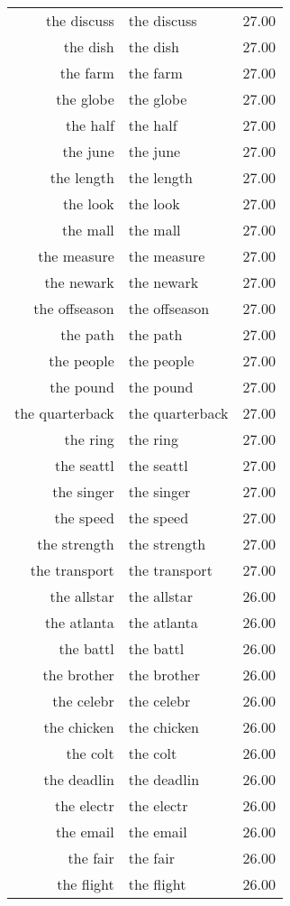 \begin{table}[ht]
\begin{tabular}{rlr}
  the discuss & the discuss & 27.00 \\ 
  the dish & the dish & 27.00 \\ 
  the farm & the farm & 27.00 \\ 
  the globe & the globe & 27.00 \\ 
  the half & the half & 27.00 \\ 
  the june & the june & 27.00 \\ 
  the length & the length & 27.00 \\ 
  the look & the look & 27.00 \\ 
  the mall & the mall & 27.00 \\ 
  the measure & the measure & 27.00 \\ 
  the newark & the newark & 27.00 \\ 
  the offseason & the offseason & 27.00 \\ 
  the path & the path & 27.00 \\ 
  the people & the people & 27.00 \\ 
  the pound & the pound & 27.00 \\ 
  the quarterback & the quarterback & 27.00 \\ 
  the ring & the ring & 27.00 \\ 
  the seattl & the seattl & 27.00 \\ 
  the singer & the singer & 27.00 \\ 
  the speed & the speed & 27.00 \\ 
  the strength & the strength & 27.00 \\ 
  the transport & the transport & 27.00 \\ 
  the allstar & the allstar & 26.00 \\ 
  the atlanta & the atlanta & 26.00 \\ 
  the battl & the battl & 26.00 \\ 
  the brother & the brother & 26.00 \\ 
  the celebr & the celebr & 26.00 \\ 
  the chicken & the chicken & 26.00 \\ 
  the colt & the colt & 26.00 \\ 
  the deadlin & the deadlin & 26.00 \\ 
  the electr & the electr & 26.00 \\ 
  the email & the email & 26.00 \\ 
  the fair & the fair & 26.00 \\ 
  the flight & the flight & 26.00 \\ 

\end{tabular}
\end{table}
